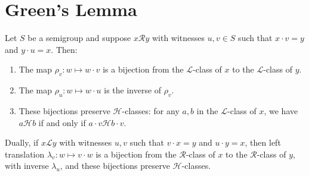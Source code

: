 \chapter{Green's Lemma}


\begin{lemma}
\label{lem:greens-lemma}
Let $S$ be a semigroup and suppose $x \mathcal{R} y$ with witnesses $u, v \in S$ such that $x \cdot v = y$ and $y \cdot u = x$. Then:
\begin{enumerate}
    \item The map $\rho_v : w \mapsto w \cdot v$ is a bijection from the $\mathcal{L}$-class of $x$ to the $\mathcal{L}$-class of $y$.
    \item The map $\rho_u : w \mapsto w \cdot u$ is the inverse of $\rho_v$.
    \item These bijections preserve $\mathcal{H}$-classes: for any $a, b$ in the $\mathcal{L}$-class of $x$, we have $a \mathcal{H} b$ if and only if $a \cdot v \mathcal{H} b \cdot v$.
\end{enumerate}
Dually, if $x \mathcal{L} y$ with witnesses $u, v$ such that $v \cdot x = y$ and $u \cdot y = x$, then left translation $\lambda_v : w \mapsto v \cdot w$ is a bijection from the $\mathcal{R}$-class of $x$ to the $\mathcal{R}$-class of $y$, with inverse $\lambda_u$, and these bijections preserve $\mathcal{H}$-classes.
\leanok
{}
\end{lemma}


